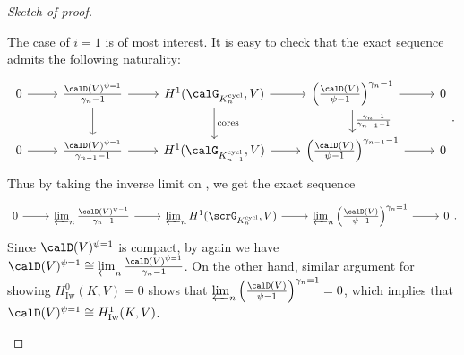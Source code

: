 \documentclass[a4paper,oneside]{amsart}
\let\opn\operatorname
\DeclareMathOperator{\cycl}{cycl}
\newcommand{\Iw}{\opn{Iw}}
\numberwithin{equation}{section}
\begin{document}
\begin{proof}[Sketch of proof]
\begin{enumerate}[label=\textit{Step \arabic*.},wide, labelwidth=!, labelindent=0pt]
              The case of $i=1$ is of most interest. It is easy to check that the exact sequence  admits the following naturality:
              $$\begin{tikzcd}
                      0\ar[r]&\frac{\calD(V)^{\psi=1}}{\gamma_n-1}\ar[r]\ar[d]&H^1(\calG_{K_n^{\cycl}},V)\ar[r]\ar[d,"\opn{cores}"]&\left(\frac{\calD(V)}{\psi-1}\right)^{\gamma_n-1}\ar[r]\ar[d,"\frac{\gamma_n-1}{\gamma_{n-1}-1}"]&0\\
                      0\ar[r]&\frac{\calD(V)^{\psi=1}}{\gamma_{n-1}-1}\ar[r]&H^1(\calG_{K_{n-1}^{\cycl}},V)\ar[r]&\left(\frac{\calD(V)}{\psi-1}\right)^{\gamma_{n-1}-1}\ar[r]&0
                  \end{tikzcd}.$$
              Thus by taking the inverse limit on , we get the exact sequence
              $$\begin{tikzcd}
                      0\ar[r]&\varprojlim_n\frac{\calD(V)^{\psi-1}}{\gamma_n-1}\ar[r]&\varprojlim_n H^1(\scrG_{K_n^{\cycl}},V)\ar[r]&\varprojlim_n\left(\frac{\calD(V)}{\psi-1}\right)^{\gamma_n=1}\ar[r]&0
                  \end{tikzcd}.$$
              Since $\calD(V)^{\psi=1}$ is compact, by \cite[Proposition I.5.6]{cherbonnier_theorie_1999} again we have $\calD(V)^{\psi=1}\cong\varprojlim_n \frac{\calD(V)^{\psi=1}}{\gamma_n-1}$. On the other hand, similar argument for showing $H^0_{\Iw}(K,V)=0$ shows that $\varprojlim_n\left(\frac{\calD(V)}{\psi-1}\right)^{\gamma_n=1}=0$, which implies that $\calD(V)^{\psi=1}\cong H^1_{\Iw}(K,V)$.
    \end{enumerate}
\end{proof}
\end{document}
